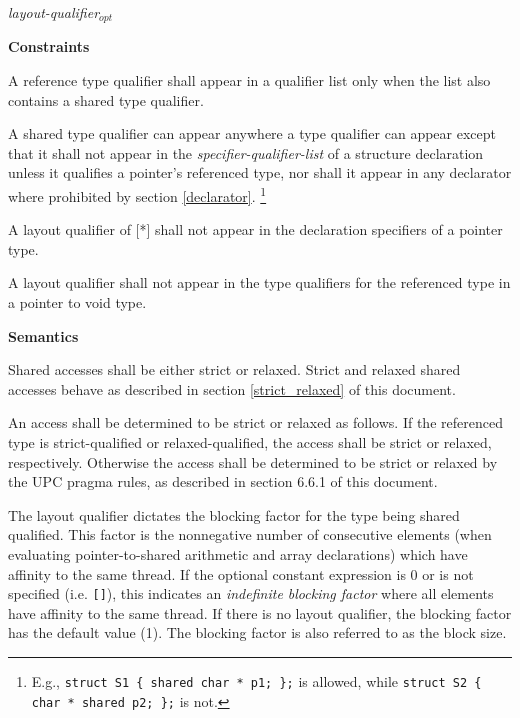 
\hspace{3em}{\bf shared} {\em layout-qualifier$_{opt}$}


\hspace{3em}{\bf relaxed}

\hspace{3em}{\bf strict}



\hspace{3em}{\bf [ {\em *}  ]}

{\bf Constraints} 

\np A reference type qualifier shall appear in a qualifier
    list only when the list also contains a shared type qualifier.

\np A shared type qualifier can appear anywhere a type qualifier can appear
    except that it shall not appear in the {\em specifier-qualifier-list} of a structure
    declaration unless it qualifies a pointer's referenced type, nor shall it appear 
    in any declarator where prohibited by section \ref{declarator}.%
    \footnote{E.g., {\tt struct S1 \{ shared char * p1; \};} is allowed,
    while {\tt struct S2 \{ char * shared p2; \};} is not.}

\np A layout qualifier of [*] shall not appear in the
    declaration specifiers of a pointer type.

\np A layout qualifier shall not appear in the type
    qualifiers for the referenced type in a pointer to void type.

{\bf Semantics} 

\np Shared accesses shall be either strict or relaxed.
    Strict and relaxed shared accesses behave as described in section
    \ref{strict_relaxed} of this document.

\np An access shall be determined to be strict or relaxed
    as follows.  If the referenced type is strict-qualified or
    relaxed-qualified, the access shall be strict or relaxed,
    respectively.  Otherwise the access shall be determined to be
    strict or relaxed by the UPC pragma rules, as described in section
    6.6.1 of this document.

\np The layout qualifier dictates the blocking factor for
    the type being shared qualified. This factor is the nonnegative
    number of consecutive elements (when evaluating pointer-to-shared
    arithmetic and array declarations) which have affinity to the
    same thread. If the optional constant expression is 0 or is not
    specified (i.e. {\tt[]}), this indicates an {\em indefinite blocking factor}
    where all elements have affinity to the same thread.  If there
    is no layout qualifier, the blocking factor has the default value
    (1). The blocking factor is also referred to as the block size.

